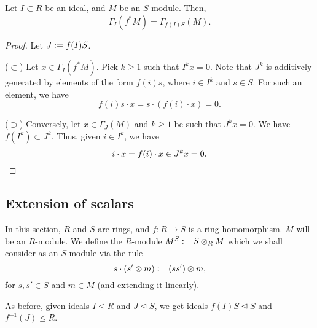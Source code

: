 \begin{prop}
	Let $I \subset R$ be an ideal, and $M$ be an $S$-module. Then,
	\begin{equation*} 
		\Gamma_{I}(f^{\ast} M) = \Gamma_{f(I)S}(M).
	\end{equation*}
\end{prop}
\begin{proof} 
	Let $J \vcentcolon= f(I)S$. 

	($\subset$) Let $x \in \Gamma_{I}(f^{\ast} M)$. Pick $k \ge 1$ such that $I^{k} x = 0$. Note that $J^{k}$ is additively generated by elements of the form $f(i) s$, where $i \in I^{k}$ and $s \in S$. For such an element, we have
	\begin{equation*} 
		f(i) s \cdot x = s \cdot (f(i) \cdot x) = 0.
	\end{equation*}

	($\supset$) Conversely, let $x \in \Gamma_{J}(M)$ and $k \ge 1$ be such that $J^{k} x = 0$. We have $f(I^{k}) \subset J^{k}$. Thus, given $i \in I^{k}$, we have
	\begin{equation*} 
		i \cdot x = f(i) \cdot x \in J^{k} x = 0. \qedhere
	\end{equation*}
\end{proof}

\subsection{Extension of scalars}

In this section, $R$ and $S$ are rings, and $f : R \to S$ is a ring homomorphism. $M$ will be an $R$-module. We define the $R$-module $M^{S} \vcentcolon= S \otimes_{R} M$ which we shall consider as an $S$-module via the rule
\begin{equation*} 
	s \cdot (s' \otimes m) \vcentcolon= (s s') \otimes m,
\end{equation*}
for $s, s' \in S$ and $m \in M$ (and extending it linearly). 

As before, given ideals $I \unlhd R$ and $J \unlhd S$, we get ideals $f(I)S \unlhd S$ and $f^{-1}(J) \unlhd R$.



